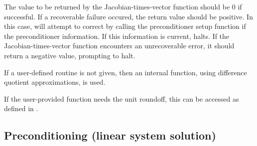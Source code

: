 {  
  The value to be returned by the Jacobian-times-vector function should be
  $0$ if successful. If a recoverable failure occured, the return value should be positive.
  In this case, {\kinsol} will attempt to correct by calling the preconditioner setup function
  if the preconditioner information. If this information is current, {\kinsol} halts.
  If the  Jacobian-times-vector function encounters an unrecoverable error, it should
  return a negative value, prompting {\kinsol} to halt.
}
{
  If a user-defined routine is not given, then an internal
  {\kinspgmr} function, using difference quotient approximations,
  is used.

  If the user-provided  function needs the unit roundoff,
  this can be accessed as  defined in .
}

\subsection{Preconditioning (linear system solution)} \label{ss:psolveFn}

